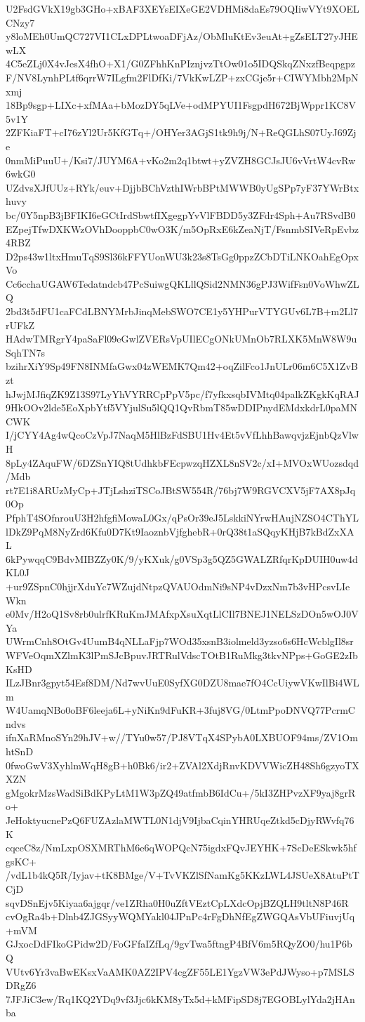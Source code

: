 U2FsdGVkX19gb3GHo+xBAF3XEYsEIXeGE2VDHMi8daEs79OQIiwVYt9XOELCNzy7
y8loMEh0UmQC727VI1CLxDPLtwoaDFjAz/ObMluKtEv3euAt+gZsELT27yJHEwLX
4C5eZLj0X4vJesX4fhO+X1/G0ZFhhKnPIznjvzTtOw01o5IDQSkqZNxzfBeqpgpz
F/NV8LynhPLtf6qrrW7ILgfm2FlDfKi/7VkKwLZP+zxCGje5r+CIWYMbh2MpNxmj
18Bp9sgp+LIXc+xfMAa+bMozDY5qLVe+odMPYUI1FsgpdH672BjWppr1KC8V5v1Y
2ZFKiaFT+cI76zYl2Ur5KfGTq+/OHYer3AGjS1tk9h9j/N+ReQGLhS07UyJ69Zje
0nmMiPuuU+/Ksi7/JUYM6A+vKo2m2q1btwt+yZVZH8GCJsJU6vVrtW4cvRw6wkG0
UZdvsXJfUUz+RYk/euv+DjjbBChVzthIWrbBPtMWWB0yUgSPp7yF37YWrBtxhuvy
bc/0Y5npB3jBFIKI6eGCtIrdSbwtfIXgegpYvVlFBDD5y3ZFdr4Sph+Au7RSvdB0
EZpejTfwDXKWzOVhDooppbC0wO3K/m5OpRxE6kZeaNjT/FsnmbSIVeRpEvbz4RBZ
D2ps43w1ltxHmuTqS9Sl36kFFYUonWU3k23s8TsGg0ppzZCbDTiLNKOahEgOpxVo
Cc6cchaUGAW6Tedatndcb47PcSuiwgQKLllQSid2NMN36gPJ3WifFsn0VoWhwZLQ
2bd3t5dFU1caFCdLBNYMrbJinqMebSWO7CE1y5YHPurVTYGUv6L7B+m2Ll7rUFkZ
HAdwTMRgrY4paSaFl09eGwlZVERsVpUIlECgONkUMnOb7RLXK5MnW8W9uSqhTN7s
bzihrXiY9Sp49FN8INMfaGwx04zWEMK7Qm42+oqZilFco1JnULr06m6C5X1ZvBzt
hJwjMJfiqZK9Z13S97LyYhVYRRCpPpV5pc/f7yfkxsqbIVMtq04palkZKgkKqRAJ
9HkOOv2lde5EoXpbYtf5VYjulSu5lQQ1QvRbmT85wDDIPnydEMdxkdrL0paMNCWK
I/jCYY4Ag4wQcoCzVpJ7NaqM5HlBzFdSBU1Hv4Et5vVfLhhBawqvjzEjnbQzVlwH
8pLy4ZAquFW/6DZSnYIQ8tUdhkbFEcpwzqHZXL8nSV2c/xI+MVOxWUozsdqd/Mdb
rt7E1i8ARUzMyCp+JTjLshziTSCoJBtSW554R/76bj7W9RGVCXV5jF7AX8pJq0Op
PfphT4SOfnrouU3H2hfgfiMowaL0Gx/qPsOr39eJ5LskkiNYrwHAujNZSO4CThYL
lDkZ9PqM8NyZrd6Kfu0D7Kt9IaoznbVjfghebR+0rQ38t1aSQqyKHjB7kBdZxXAL
6kPywqqC9BdvMIBZZy0K/9/yKXuk/g0VSp3g5QZ5GWALZRfqrKpDUIH0uw4dKL0J
+ur9ZSpnC0hjjrXduYc7WZujdNtpzQVAUOdmNi9sNP4vDzxNm7b3vHPcsvLIeWkn
e0Mv/H2oQ1Sv8rb0ulrfKRuKmJMAfxpXsuXqtLlCIl7BNEJ1NELSzDOn5wOJ0VYa
UWrmCnh8OtGv4UumB4qNLLaFjp7WOd35xsnB3iolmeld3yzso6s6HcWcblgIl8sr
WFVeOqmXZlmK3lPmSJcBpuvJRTRulVdscTOtB1RuMkg3tkvNPps+GoGE2zIbKsHD
ILzJBnr3gpyt54Esf8DM/Nd7wvUuE0SyfXG0DZU8mae7fO4CcUiywVKwIlBi4WLm
W4UamqNBo0oBF6leeja6L+yNiKn9dFuKR+3fuj8VG/0LtmPpoDNVQ77PcrmCndvs
ifnXaRMnoSYn29hJV+w//TYu0w57/PJ8VTqX4SPybA0LXBUOF94ms/ZV1OmhtSnD
0fwoGwV3XyhlmWqH8gB+h0Bk6/ir2+ZVAl2XdjRnvKDVVWicZH48Sh6gzyoTXXZN
gMgokrMzsWadSiBdKPyLtM1W3pZQ49atfmbB6IdCu+/5kI3ZHPvzXF9yaj8grRo+
JeHoktyucnePzQ6FUZAzlaMWTL0N1djV9IjbaCqinYHRUqeZtkd5cDjyRWvfq76K
cqceC8z/NmLxpOSXMRThM6e6qWOPQcN75igdxFQvJEYHK+7ScDeESkwk5hfgsKC+
/vdL1b4kQ5R/Iyjav+tK8BMge/V+TvVKZlSfNamKg5KKzLWL4JSUeX8AtuPtTCjD
sqvDSnEjv5Kiyaa6ajgqr/ve1ZRha0H0uZftVEztCpLXdcOpjBZQLH9tltN8P46R
cvOgRa4b+Dlnb4ZJGSyyWQMYakl04JPnPc4rFgDhNfEgZWGQAsVbUFiuvjUq+mVM
GJxocDdFIkoGPidw2D/FoGFfaIZfLq/9gvTwa5ftngP4BfV6m5RQyZO0/hu1P6bQ
VUtv6Yr3vaBwEKsxVaAMK0AZ2IPV4cgZF55LE1YgzVW3ePdJWyso+p7MSLSDRgZ6
7JFJiC3ew/Rq1KQ2YDq9vf3Jjc6kKM8yTx5d+kMFipSD8j7EGOBLylYda2jHAnba
